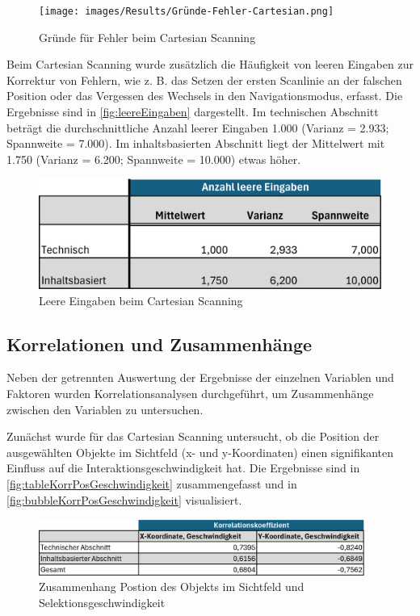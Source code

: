 \begin{figure}[tbh]
 \centering
\texttt{[image: images/Results/Gründe-Fehler-Cartesian.png]}
 \caption{Gründe für Fehler beim Cartesian Scanning}
 \label{fig:gründeFehlerCartesian}
\end{figure}

Beim Cartesian Scanning wurde zusätzlich die Häufigkeit von leeren Eingaben zur Korrektur von Fehlern, wie z. B.  das Setzen der ersten Scanlinie an der falschen Position oder das Vergessen des Wechsels in den Navigationsmodus, erfasst. Die Ergebnisse sind in \autoref{fig:leereEingaben} dargestellt. 
Im technischen Abschnitt beträgt die durchschnittliche Anzahl leerer Eingaben 1.000 (Varianz = 2.933; Spannweite = 7.000). Im inhaltsbasierten Abschnitt liegt der Mittelwert mit 1.750 (Varianz = 6.200; Spannweite = 10.000) etwas höher.

\begin{figure}[tbh]
    \centering
    \includegraphics{images/Results/leereEingaben.png}
    \caption{Leere Eingaben beim Cartesian Scanning}
    \label{fig:leereEingaben}
\end{figure}

\subsection{Korrelationen und Zusammenhänge}

Neben der getrennten Auswertung der Ergebnisse der einzelnen Variablen und Faktoren wurden Korrelationsanalysen durchgeführt, um Zusammenhänge zwischen den Variablen zu untersuchen.

Zunächst wurde für das Cartesian Scanning untersucht, ob die Position der ausgewählten Objekte im Sichtfeld (x- und y-Koordinaten) einen signifikanten Einfluss auf die Interaktionsgeschwindigkeit hat. Die Ergebnisse sind in \autoref{fig:tableKorrPosGeschwindigkeit} zusammengefasst und in \autoref{fig:bubbleKorrPosGeschwindigkeit} visualisiert. 

\begin{figure}[tbh]
    \centering
    \includegraphics[width=0.95\textwidth]{images/Results/Korrelation-Position-Geschwindigkeit-Table.png}
    \caption{Zusammenhang Postion des Objekts im Sichtfeld und Selektionsgeschwindigkeit}
    \label{fig:tableKorrPosGeschwindigkeit}
\end{figure}

